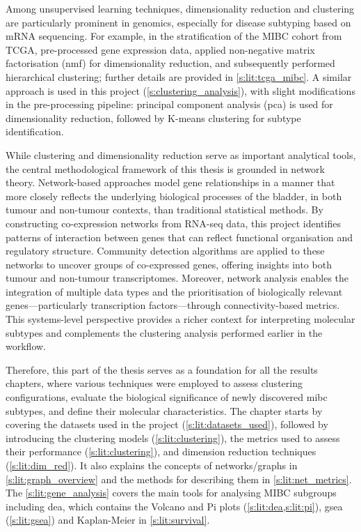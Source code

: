 Among unsupervised learning techniques, dimensionality reduction and clustering are particularly prominent in genomics, especially for disease subtyping based on mRNA sequencing. For example, in the stratification of the MIBC cohort from TCGA, \citet{Robertson2017-mg} pre-processed gene expression data, applied non-negative matrix factorisation (\acrshort{nmf}) for dimensionality reduction, and subsequently performed hierarchical clustering; further details are provided in \cref{s:lit:tcga_mibc}. A similar approach is used in this project (\cref{s:clustering_analysis}), with slight modifications in the pre-processing pipeline: principal component analysis (\acrshort{pca}) is used for dimensionality reduction, followed by K-means clustering for subtype identification.


While clustering and dimensionality reduction serve as important analytical tools, the central methodological framework of this thesis is grounded in network theory. Network-based approaches model gene relationships in a manner that more closely reflects the underlying biological processes of the bladder, in both tumour and non-tumour contexts, than traditional statistical methods. By constructing co-expression networks from RNA-seq data, this project identifies patterns of interaction between genes that can reflect functional organisation and regulatory structure. Community detection algorithms are applied to these networks to uncover groups of co-expressed genes, offering insights into both tumour and non-tumour transcriptomes. Moreover, network analysis enables the integration of multiple data types and the prioritisation of biologically relevant genes—particularly transcription factors—through connectivity-based metrics. This systems-level perspective provides a richer context for interpreting molecular subtypes and complements the clustering analysis performed earlier in the workflow.


Therefore, this part of the thesis serves as a foundation for all the results chapters, where various techniques were employed to assess clustering configurations, evaluate the biological significance of newly discovered \acrshort{mibc} subtypes, and define their molecular characteristics. The chapter starts by covering the datasets used in the project (\cref{s:lit:datasets_used}), followed by introducing the clustering models (\cref{s:lit:clustering}), the metrics used to assess their performance (\cref{s:lit:clustering}), and dimension reduction techniques (\cref{s:lit:dim_red}). It also explains the concepts of networks/graphs in \cref{s:lit:graph_overview} and the methods for describing them in \cref{s:lit:net_metrics}. The \cref{s:lit:gene_analysis} covers the main tools for analysing MIBC subgroups including \acrfull{dea}, which contains the Volcano and Pi plots (\cref{s:lit:dea,s:lit:pi}), \acrfull{gsea} (\cref{s:lit:gsea}) and Kaplan-Meier in \cref{s:lit:survival}.


